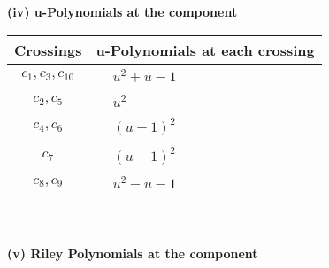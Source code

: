 \documentclass[1p]{elsarticle_modified}
\theoremstyle{definition}
\begin{document}
\newpage\renewcommand{\arraystretch}{1}
\flushleft \textbf{(iv) u-Polynomials at the component}\newline \\
\begin{tabular}{m{50pt}|m{274pt}}
Crossings & \hspace{64pt}u-Polynomials at each crossing \\
\hline $$\begin{aligned}c_{1},c_{3},c_{10}\end{aligned}$$&$\begin{aligned}
&u^2+u-1
\end{aligned}$\\
\hline $$\begin{aligned}c_{2},c_{5}\end{aligned}$$&$\begin{aligned}
&u^2
\end{aligned}$\\
\hline $$\begin{aligned}c_{4},c_{6}\end{aligned}$$&$\begin{aligned}
&(u-1)^2
\end{aligned}$\\
\hline $$\begin{aligned}c_{7}\end{aligned}$$&$\begin{aligned}
&(u+1)^2
\end{aligned}$\\
\hline $$\begin{aligned}c_{8},c_{9}\end{aligned}$$&$\begin{aligned}
&u^2- u-1
\end{aligned}$\\
\hline
\end{tabular}\\~\\
\newpage\renewcommand{\arraystretch}{1}
\flushleft \textbf{(v) Riley Polynomials at the component}\newline \\
\end{document}
